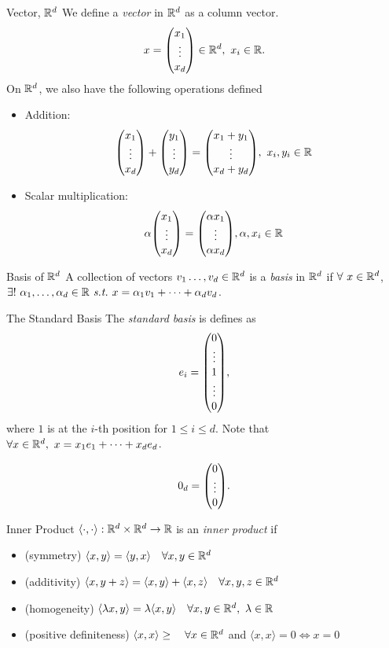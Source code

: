 \begin{df}{Vector, ${\mathbb{R}}^d$}
	We define a \textit{vector} in ${\mathbb{R}}^d$ as a column vector. \[x=\mqty(x_1\\\vdots\\x_d)\in\R^d,\ x_i\in\R.\] On ${\mathbb{R}}^d$, we also have the following operations defined
	\begin{itemize}
		\item Addition: \[\mqty(x_1\\\vdots\\x_d)+\mqty(y_1\\\vdots\\y_d)=\mqty(x_1+y_1\\\vdots\\x_d+y_d),\ x_i,y_i\in\R\]
		\item Scalar multiplication: \[\alpha\mqty(x_1\\\vdots\\x_d)=\mqty(\alpha x_1\\\vdots\\\alpha x_d),\alpha,x_i\in\R\]
	\end{itemize}
\end{df}
\begin{df}{Basis of ${\mathbb{R}}^d$}
	A collection of vectors $v_1\dots,v_d\in{\mathbb{R}}^d$ is a \textit{basis} in ${\mathbb{R}}^d$ if $\forall\ x\in{\mathbb{R}}^d$, $\exists!\ \alpha_1,\dots,\alpha_d\in{\mathbb{R}}\emph{\ s.t.\ } x=\alpha_1v_1+\cdots+\alpha_dv_d$.	
\end{df}
\begin{eg}{The Standard Basis}
	The \textit{standard basis} is defines as \[e_i=\mqty(0\\\vdots\\1\\\vdots\\0),\]	 where $1$ is at the $i$-th position for $1\leq i\leq d$. Note that $\forall x\in\R^d,\ x=x_1e_1+\cdots+x_de_d$.
\end{eg}
\begin{nota}
	\[0_d=\mqty(0\\\vdots\\0).\]	
\end{nota}
\begin{df}{Inner Product}
	$\left\langle \cdot, \cdot \right\rangle:{\mathbb{R}}^d\times{\mathbb{R}}^d\to{\mathbb{R}}$ is an \textit{inner product} if
	\begin{itemize}
		\item (symmetry) $\langle x,y\rangle=\langle y,x\rangle\quad\forall x,y\in{\mathbb{R}}^d$
		\item (additivity) $\langle x,y+z\rangle=\langle x,y\rangle+\langle x,z\rangle\quad\forall x,y,z\in{\mathbb{R}}^d$
		\item (homogeneity) $\langle\lambda x,y\rangle=\lambda\langle x,y\rangle\quad\forall x,y\in\R^d,\ \lambda\in\R$
		\item (positive definiteness) $\langle x,x\rangle\geq\quad\forall x\in{\mathbb{R}}^d$ and $\langle x,x\rangle=0\iff x=0$
	\end{itemize}
\end{df}
